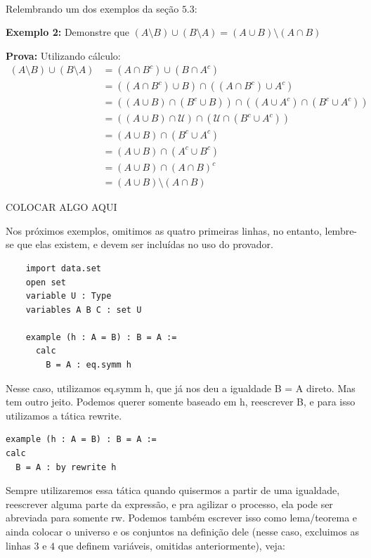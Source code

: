 $\qquad$

Relembrando um dos exemplos da seção $5.3$:

\textbf{Exemplo 2:} Demonstre que $(A \setminus B) \cup (B \setminus A) = (A \cup B) \setminus (A \cap B)$

\textbf{Prova:} Utilizando cálculo:
\begin{equation*}
\begin{aligned}
  (A \setminus B) \cup (B \setminus A) &= (A \cap B^c) \cup (B \cap A^c)\\
  &= ((A \cap B^c) \cup B) \cap ((A \cap B^c) \cup A^c)\\
  &= ((A \cup B) \cap (B^c \cup B)) \cap ((A \cup A^c) \cap (B^c \cup A^c))\\
  &= ((A \cup B) \cap \mathcal U) \cap (\mathcal U \cap (B^c \cup A^c))\\
  &= (A \cup B) \cap (B^c \cup A^c)\\
  &= (A \cup B) \cap (A^c \cup B^c)\\
  &= (A \cup B) \cap (A \cap B)^c\\
  &= (A \cup B) \setminus (A \cap B)
\end{aligned}
\end{equation*}

COLOCAR ALGO AQUI

Nos próximos exemplos, omitimos as quatro primeiras linhas, no entanto, lembre-se que elas existem, e devem ser incluídas no uso do provador.

\begin{lstlisting}
    import data.set
    open set
    variable U : Type
    variables A B C : set U

    example (h : A = B) : B = A :=
      calc
        B = A : eq.symm h
\end{lstlisting}

Nesse caso, utilizamos {\selectfont eq.symm h}, que já nos deu a igualdade {\selectfont B = A} direto. Mas tem outro jeito. Podemos querer somente baseado em {\selectfont h}, reescrever {\selectfont B}, e para isso utilizamos a tática {\selectfont rewrite}.

\begin{lstlisting}
example (h : A = B) : B = A :=
calc
  B = A : by rewrite h \end{lstlisting}

Sempre utilizaremos essa tática quando quisermos a partir de uma igualdade, reescrever alguma parte da expressão, e pra agilizar o processo, ela pode ser abreviada para somente {\selectfont rw}.
Podemos também escrever isso como lema/teorema e ainda colocar o universo e os conjuntos na definição dele (nesse caso, excluimos as linhas $3$ e $4$ que definem variáveis, omitidas anteriormente), veja:

